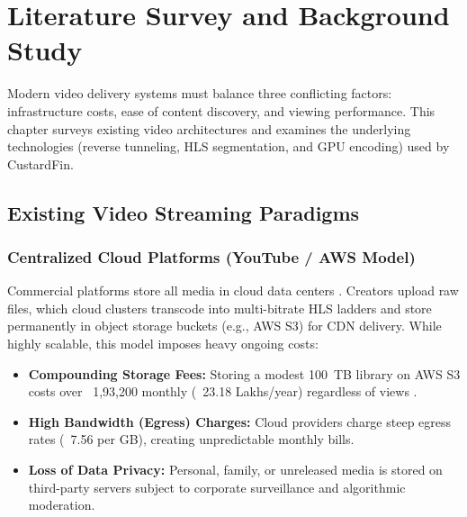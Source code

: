
\chapter{Literature Survey and Background Study}
\label{chap:literature_survey}

Modern video delivery systems must balance three conflicting factors: infrastructure costs, ease of content discovery, and viewing performance. This chapter surveys existing video architectures and examines the underlying technologies (reverse tunneling, HLS segmentation, and GPU encoding) used by CustardFin.

\section{Existing Video Streaming Paradigms}
\label{sec:survey_paradigms}

\subsection{Centralized Cloud Platforms (YouTube / AWS Model)}
Commercial platforms store all media in cloud data centers \cite{armbrust2010view}. Creators upload raw files, which cloud clusters transcode into multi-bitrate HLS ladders and store permanently in object storage buckets (e.g., AWS S3) for CDN delivery. While highly scalable, this model imposes heavy ongoing costs:
\begin{itemize}
    \item \textbf{Compounding Storage Fees:} Storing a modest 100~TB library on AWS S3 costs over \rupee~1,93,200 monthly (\rupee~23.18 Lakhs/year) regardless of views \cite{aws2024s3pricing}.
    \item \textbf{High Bandwidth (Egress) Charges:} Cloud providers charge steep egress rates (\rupee~7.56 per GB), creating unpredictable monthly bills.
    \item \textbf{Loss of Data Privacy:} Personal, family, or unreleased media is stored on third-party servers subject to corporate surveillance and algorithmic moderation.
\end{itemize}

